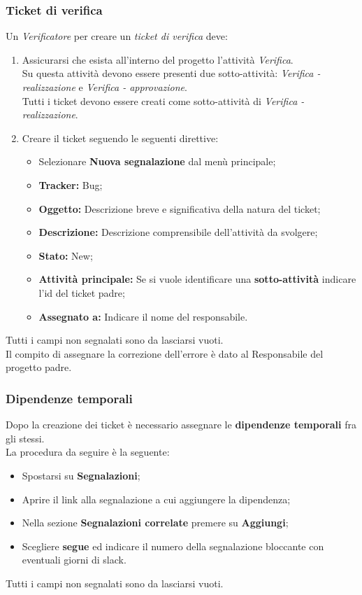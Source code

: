       \subsubsection{Ticket di verifica}
        Un \emph{Verificatore} per creare un \emph{ticket di verifica} deve:
        \begin{enumerate}
          \item Assicurarsi che esista all'interno del progetto l'attività \emph{Verifica}.\\
          Su questa attività devono essere presenti due sotto-attività: \emph{Verifica - realizzazione} e \emph{Verifica - approvazione}.\\
          Tutti i ticket devono essere creati come sotto-attività di \emph{Verifica - realizzazione}.
          \item Creare il ticket seguendo le seguenti direttive:
          \bgroup
            \begin{itemize}
              \item Selezionare \textbf{Nuova segnalazione} dal menù principale;
              \item \textbf{Tracker: }Bug;
              \item \textbf{Oggetto: }Descrizione breve e significativa della natura del ticket;
              \item \textbf{Descrizione: }Descrizione comprensibile dell'attività da svolgere;
              \item \textbf{Stato: }New;
              \item \textbf{Attività principale: }Se si vuole identificare una \textbf{sotto-attività} indicare l'id del ticket padre;
              \item \textbf{Assegnato a: }Indicare il nome del responsabile.
            \end{itemize}
          \egroup
        \end{enumerate}
      Tutti i campi non segnalati sono da lasciarsi vuoti.\\
      Il compito di assegnare la correzione dell'errore è dato al Responsabile del progetto padre.
    \subsubsection{Dipendenze temporali}
      Dopo la creazione dei ticket è necessario assegnare le \textbf{dipendenze temporali} fra gli stessi.\\
      La procedura da seguire è la seguente:
      \begin{itemize}
        \item Spostarsi su \textbf{Segnalazioni};
        \item Aprire il link alla segnalazione a cui aggiungere la dipendenza;
        \item Nella sezione \textbf{Segnalazioni correlate} premere su \textbf{Aggiungi};
        \item Scegliere \textbf{segue} ed indicare il numero della segnalazione bloccante con eventuali giorni di slack.
      \end{itemize}
      Tutti i campi non segnalati sono da lasciarsi vuoti.
